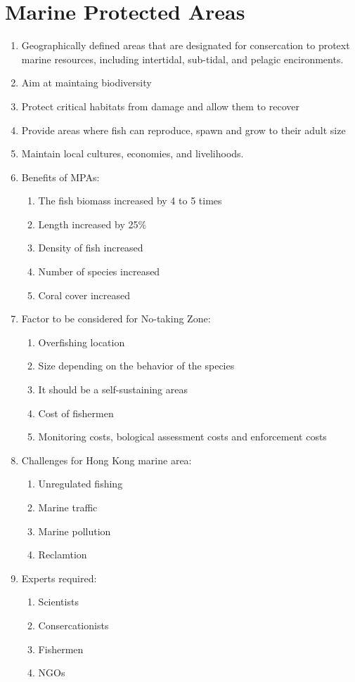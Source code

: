 \documentclass{report}
\begin{document}
\section{Marine Protected Areas}
\begin{enumerate}
    \item Geographically defined areas that are designated for consercation to protext marine resources, including intertidal, sub-tidal, and pelagic encironments.
    \item Aim at maintaing biodiversity
    \item Protect critical habitats from damage and allow them to recover
    \item Provide areas where fish can reproduce, spawn and grow to their adult size
    \item Maintain local cultures, economies, and livelihoods.
    \item Benefits of MPAs:
    \begin{enumerate}
        \item The fish biomass increased by 4 to 5 times
        \item Length increased by 25$\%$
        \item Density of fish increased
        \item Number of species increased
        \item Coral cover increased
    \end{enumerate}
    \item Factor to be considered for No-taking Zone:
    \begin{enumerate}
        \item Overfishing location
        \item Size depending on the behavior of the species
        \item It should be a self-sustaining areas
        \item Cost of fishermen
        \item Monitoring costs, bological assessment costs and enforcement costs
    \end{enumerate}
    \item Challenges for Hong Kong marine area:
    \begin{enumerate}
        \item Unregulated fishing
        \item Marine traffic
        \item Marine pollution
        \item Reclamtion
    \end{enumerate}
    \item Experts required:
    \begin{enumerate}
        \item Scientists
        \item Consercationists
        \item Fishermen
        \item NGOs
    \end{enumerate}
\end{enumerate}
\end{document}
